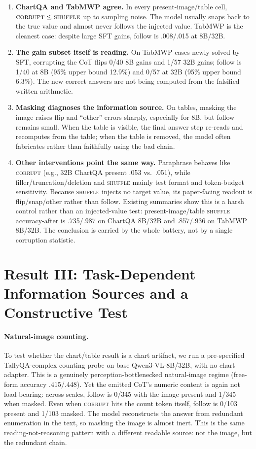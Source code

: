 \documentclass[11pt]{article}
\newcommand{\corrupt}{\textsc{corrupt}}
\newcommand{\shuffle}{\textsc{shuffle}}
\begin{document}
\begin{enumerate}[leftmargin=1.6em,itemsep=2pt]
  \item \textbf{ChartQA and TabMWP agree.} In every present-image/table cell, $\corrupt{}\leq\shuffle{}$ up to sampling noise. The model usually snaps back to the true value and almost never follows the injected value. TabMWP is the cleanest case: despite large SFT gains, follow is .008/.015 at 8B/32B.
  \item \textbf{The gain subset itself is reading.} On TabMWP cases newly solved by SFT, corrupting the CoT flips 0/40 8B gains and 1/57 32B gains; follow is 1/40 at 8B (95\% upper bound 12.9\%) and 0/57 at 32B (95\% upper bound 6.3\%). The new correct answers are not being computed from the falsified written arithmetic.
  \item \textbf{Masking diagnoses the information source.} On tables, masking the image raises flip and ``other'' errors sharply, especially for 8B, but follow remains small. When the table is visible, the final answer step re-reads and recomputes from the table; when the table is removed, the model often fabricates rather than faithfully using the bad chain.
  \item \textbf{Other interventions point the same way.} Paraphrase behaves like \corrupt{} (e.g., 32B ChartQA present .053 vs.\ .051), while filler/truncation/deletion and \shuffle{} mainly test format and token-budget sensitivity. Because \shuffle{} injects no target value, its paper-facing readout is flip/snap/other rather than follow. Existing summaries show this is a harsh control rather than an injected-value test: present-image/table \shuffle{} accuracy-after is .735/.987 on ChartQA 8B/32B and .857/.936 on TabMWP 8B/32B. The conclusion is carried by the whole battery, not by a single corruption statistic.
\end{enumerate}

\section{Result III: Task-Dependent Information Sources and a Constructive Test}
\label{sec:regime}

\paragraph{Natural-image counting.}
To test whether the chart/table result is a chart artifact, we run a pre-specified TallyQA-complex counting probe on base Qwen3-VL-8B/32B, with no chart adapter. This is a genuinely perception-bottlenecked natural-image regime (free-form accuracy .415/.448). Yet the emitted CoT's numeric content is again not load-bearing: across scales, follow is 0/345 with the image present and 1/345 when masked. Even when \corrupt{} hits the count token itself, follow is 0/103 present and 1/103 masked. The model reconstructs the answer from redundant enumeration in the text, so masking the image is almost inert. This is the same reading-not-reasoning pattern with a different readable source: not the image, but the redundant chain.
\end{document}
